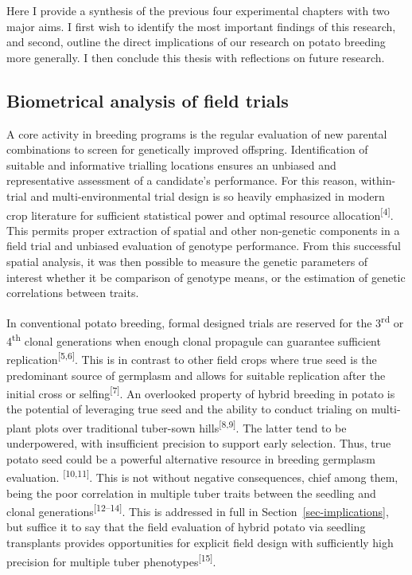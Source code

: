 Here I provide a synthesis of the previous four experimental chapters
with two major aims. I first wish to identify the most important
findings of this research, and second, outline the direct implications
of our research on potato breeding more generally. I then conclude this
thesis with reflections on future research.

\subsection{Biometrical analysis of field
trials}\label{biometrical-analysis-of-field-trials}

A core activity in breeding programs is the regular evaluation of new
parental combinations to screen for genetically improved offspring.
Identification of suitable and informative trialling locations ensures
an unbiased and representative assessment of a candidate's performance.
For this reason, within-trial and multi-environmental trial design is so
heavily emphasized in modern crop literature for sufficient statistical
power and optimal resource allocation\textsuperscript{{[}4{]}}. This
permits proper extraction of spatial and other non-genetic components in
a field trial and unbiased evaluation of genotype performance. From this
successful spatial analysis, it was then possible to measure the genetic
parameters of interest whether it be comparison of genotype means, or
the estimation of genetic correlations between traits.

In conventional potato breeding, formal designed trials are reserved for
the 3\textsuperscript{rd} or 4\textsuperscript{th} clonal generations
when enough clonal propagule can guarantee sufficient
replication\textsuperscript{{[}5,6{]}}. This is in contrast to other
field crops where true seed is the predominant source of germplasm and
allows for suitable replication after the initial cross or
selfing\textsuperscript{{[}7{]}}. An overlooked property of hybrid
breeding in potato is the potential of leveraging true seed and the
ability to conduct trialing on multi-plant plots over traditional
tuber-sown hills\textsuperscript{{[}8,9{]}}. 
The latter tend to be underpowered, with insufficient precision to support early selection. Thus, true potato seed could be a powerful alternative resource in breeding germplasm evaluation. \textsuperscript{{[}10,11{]}}. This is not without negative
consequences, chief among them, being the poor correlation in multiple
tuber traits between the seedling and clonal
generations\textsuperscript{{[}12--14{]}}. This is addressed in full in
Section~\ref{sec-implications}, but suffice it to say that the field
evaluation of hybrid potato via seedling transplants provides
opportunities for explicit field design with sufficiently high precision
for multiple tuber phenotypes\textsuperscript{{[}15{]}}.

